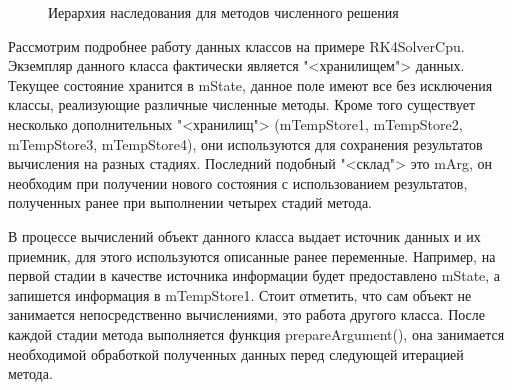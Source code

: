 \documentclass[a4paper, 14pt]{extarticle}
\theoremstyle{definition}
\begin{document}
\begin{figure}[h]
	\caption{Иерархия наследования для методов численного решения}
	\label{ris:solvers}
\end{figure}

\par Рассмотрим подробнее работу данных классов на примере RK4SolverCpu. Экземпляр данного класса фактически является "<хранилищем"> данных. Текущее состояние хранится в mState, данное поле имеют все без исключения классы, реализующие различные численные методы. Кроме того существует несколько дополнительных "<хранилищ"> (mTempStore1, mTempStore2, mTempStore3, mTempStore4), они используются для сохранения результатов вычисления на разных стадиях. Последний подобный "<склад">  это mArg, он необходим при получении нового состояния с использованием результатов, полученных ранее при выполнении четырех стадий метода.

\par В процессе вычислений объект данного класса выдает источник данных и их приемник, для этого используются описанные ранее переменные. Например, на первой стадии в качестве источника информации будет предоставлено mState, а запишется информация в mTempStore1. Стоит отметить, что сам объект не занимается непосредственно вычислениями, это работа другого класса. После каждой стадии метода выполняется функция prepareArgument(), она занимается необходимой обработкой полученных данных перед следующей итерацией метода.
\end{document}
